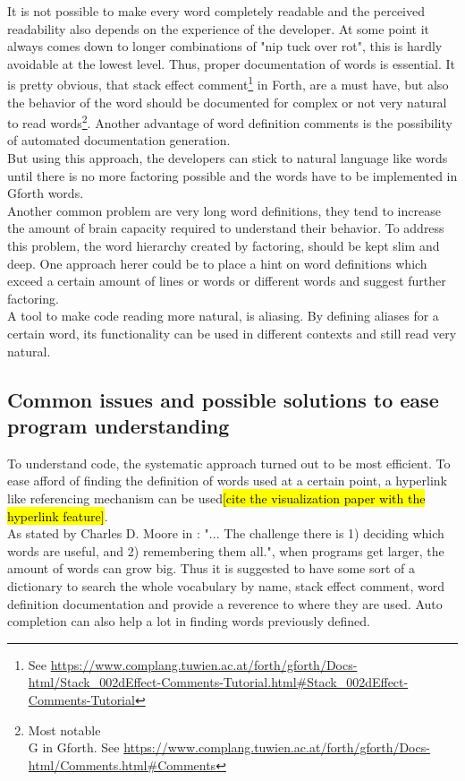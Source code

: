 It is not possible to make every word completely readable and the perceived readability also depends on the experience of the developer. At some point  it always comes down to longer combinations of "nip tuck over rot", this is hardly avoidable at the lowest level. Thus, proper documentation of words is essential. It is pretty obvious, that stack effect comment\footnote{See \url{https://www.complang.tuwien.ac.at/forth/gforth/Docs-html/Stack\_002dEffect-Comments-Tutorial.html\#Stack\_002dEffect-Comments-Tutorial}} in Forth, are a must have, but also the behavior of the word should be documented for complex or not very natural to read words\footnote{Most notable \\G in Gforth. See \url{https://www.complang.tuwien.ac.at/forth/gforth/Docs-html/Comments.html\#Comments}}. Another advantage of word definition comments is the possibility of automated documentation generation.\\
But using this approach, the developers can stick to natural language like words until there is no more factoring possible and the words have to be implemented in Gforth words.
\\
Another common problem are very long word definitions, they tend to increase the amount of brain capacity required to understand their behavior. To address this problem, the word hierarchy created by factoring, should be kept slim and deep. One approach herer could be to place a hint on word definitions which exceed a certain amount of lines or words or different words and suggest further factoring.
\\
A tool to make code reading more natural, is aliasing. By defining aliases for a certain word, its functionality can be used in different contexts and still read very natural.

\subsection{Common issues and possible solutions to ease program understanding}

To understand code, the systematic approach turned out to be most efficient\cite{Robillard:2004:EDI:1042203.1042417}. To ease afford of finding the definition of words used at a certain point, a hyperlink like referencing mechanism can be used\hl{[cite the visualization paper with the hyperlink feature]}.\\
As stated by \gls{Charles D. Moore} in \cite{Biancuzzi:2009:MPC:1592983}: "... The challenge there is 1) deciding which words are useful, and 2) remembering them all.", when programs get larger, the amount of words can grow big. Thus it is suggested to have some sort of a dictionary to search the whole vocabulary by name, stack effect comment, word definition documentation and provide a reverence to where they are used. Auto completion can also help a lot in finding words previously defined.

